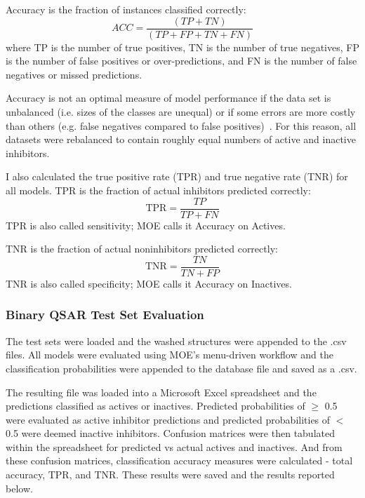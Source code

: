 Accuracy is the fraction of instances classified correctly:
$$ ACC =\frac{(TP + TN)}{(TP + FP + TN + FN)} $$
where TP is the number of true positives, TN is the number of true negatives, FP is the number of false positives or over-predictions, and FN is the number of false negatives or missed predictions.

Accuracy is not an optimal measure of model performance if the data set is unbalanced (i.e. sizes of the classes are unequal) or if some errors are more costly than others (e.g. false negatives compared to false positives)~\cite{Lapins2013}. For this reason, all datasets were rebalanced to contain roughly equal numbers of active and inactive inhibitors.

I also calculated the true positive rate (TPR) and true negative rate (TNR) for all models. TPR is the fraction of actual inhibitors predicted correctly:
$$ \mathrm{TPR} = \frac{TP}{TP + FN} $$
TPR is also called sensitivity; MOE calls it Accuracy on Actives.

TNR is the fraction of actual noninhibitors predicted correctly:
$$ \mathrm{TNR} = \frac{TN}{TN + FP} $$
TNR is also called specificity; MOE calls it Accuracy on Inactives.

\subsubsection{Binary QSAR Test Set Evaluation}
The test sets were loaded and the washed structures were appended to the .csv files. All models were evaluated using MOE's menu-driven workflow and the classification probabilities were appended to the database file and saved as a .csv.  

The resulting file was loaded into a Microsoft Excel spreadsheet and the predictions classified as actives or inactives. Predicted probabilities of $\geq$ 0.5 were evaluated as active inhibitor predictions and predicted probabilities of $<$ 0.5 were deemed inactive inhibitors. Confusion matrices were then tabulated within the spreadsheet for predicted vs actual actives and inactives. And from these confusion matrices, classification accuracy measures were calculated - total accuracy, TPR, and TNR. These results were saved and the results reported below.

